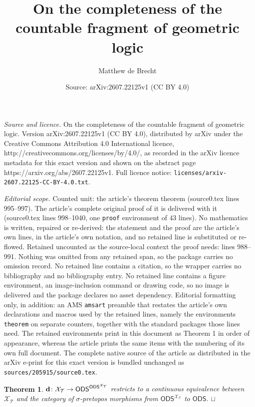 \documentclass[10pt,a4paper]{amsart}
\title{On the completeness of the countable fragment of geometric logic}
\author{Matthew de Brecht}
\date{Source: arXiv:2607.22125v1 (CC BY 4.0)}
\newtheorem{theorem}{Theorem}
\newcommand{\ODS}{{\mathsf{ODS}}}
\def\cal#1{{\mathcal #1}}
\def\calT{{\cal T}}
\def\calX{{\cal X}}
\def\qed{\ifmmode\squareforqed\else{\unskip\nobreak\hfil
\penalty50\hskip1em\null\nobreak\hfil\squareforqed
\parfillskip=0pt\finalhyphendemerits=0\endgraf}\fi}
\def\squareforqed{\hbox{\rlap{$\sqcap$}$\sqcup$}}
\newcommand{\y}{{\mathsf{\bf d}}}
\begin{document}
\maketitle

\noindent\emph{Source and licence.} On the completeness of the countable fragment of geometric logic. Version arXiv:2607.22125v1 (CC BY 4.0), distributed by arXiv under the Creative Commons Attribution 4.0 International licence, http://creativecommons.org/licenses/by/4.0/, as recorded in the arXiv licence metadata for this exact version and shown on the abstract page https://arxiv.org/abs/2607.22125v1. Full licence notice: \texttt{licenses/arxiv-2607.22125-CC-BY-4.0.txt}.\par\smallskip

\noindent\textit{Editorial scope.} Counted unit: the article's theorem theorem (source0.tex lines 995--997). The article's complete original proof of it is delivered with it (source0.tex lines 998--1040, one \texttt{proof} environment of 43 lines). No mathematics is written, repaired or re-derived: the statement and the proof are the article's own lines, in the article's own notation, and no retained line is substituted or re-flowed.  Retained uncounted as the source-local context the proof needs: lines 988--991.  Nothing was omitted from any retained span, so the package carries no omission record.  No retained line contains a citation, so the wrapper carries no bibliography and no bibliography entry.  No retained line contains a figure environment, an image-inclusion command or drawing code, so no image is delivered and the package declares no asset dependency.  Editorial formatting only, in addition: an AMS \texttt{amsart} preamble that restates the article's own declarations and macros used by the retained lines, namely the environments \texttt{theorem} on separate counters, together with the standard packages those lines need.  The retained environments print in this document as Theorem 1 in order of appearance, whereas the article prints the same items with the numbering of its own full document.  The complete native source of the article as distributed in the arXiv e-print for this exact version is bundled unchanged as \texttt{sources/205915/source0.tex}.
\begin{theorem}\label{thm:XTsober}
$\y\colon \calX_\calT\to \ODS^{\ODS^{\calX_\calT}}$ restricts to a continuous equivalence between $\calX_\calT$ and the category of $\sigma$-pretopos morphisms from $\ODS^{\calX_\calT}$ to $\ODS$.
\qed
\end{theorem}
\end{document}
